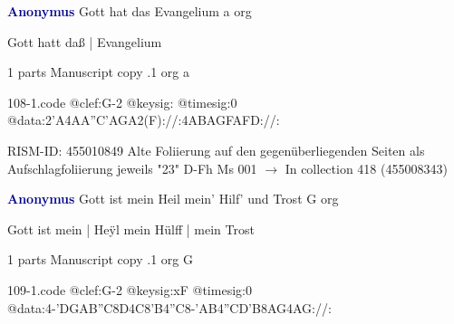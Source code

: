 \documentclass[twocolumn]{book}
\begin{document}
\newline \par \vspace{7pt} \textcolor{darkblue}{\textbf{Anonymus  }}
\newline Gott hat das Evangelium  a  
\newline org
\newline \begin{itshape}[f.22v, at left:] Gott hatt daß | Evangelium\end{itshape} 
\newline \textcolor{darkblue}{}  1 parts  
\newline Manuscript copy
.1  org  a  
\begin{filecontents*}{108-1.code}
@clef:G-2
@keysig:
@timesig:0
@data:2'A4AA''C'AGA2(F)://:4ABAGFAFD://:
\end{filecontents*}
\newline
%

\newline RISM-ID: 455010849
\newline Alte Foliierung auf den gegenüberliegenden Seiten als Aufschlagfoliierung jeweils "23"
\newline D-Fh  Ms 001
\newline $\rightarrow$ In collection 418 (455008343)

\newline \par \vspace{7pt} \textcolor{darkblue}{\textbf{Anonymus  }}
\newline Gott ist mein Heil mein' Hilf' und Trost  G  
\newline org
\newline \begin{itshape}[f.35v, at left:] Gott ist mein | Heÿl mein Hülff | mein Trost\end{itshape} 
\newline \textcolor{darkblue}{}  1 parts  
\newline Manuscript copy
.1  org  G  
\begin{filecontents*}{109-1.code}
@clef:G-2
@keysig:xF
@timesig:0
@data:4-'DGAB''C8D4C8'B4''C8-'AB4''CD'B{8AG}4AG://:
\end{filecontents*}
\newline
%
\end{document}
